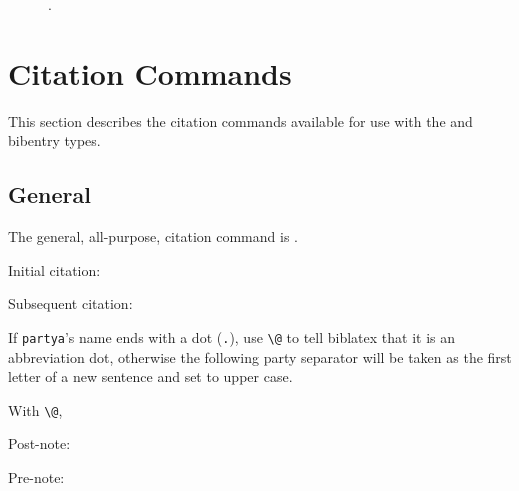 
\begin{figure}
\begin{center}
\toggletrue{lcimageshow}
\caption[The Velocity]{.}
\end{center}
\end{figure}


\renewcommand\numpardelimpre{\medskip}\renewcommand\numparindent{\hspace{0.5em}}
\section{Citation Commands}

\p This section describes the citation commands available for use with the  and  bibentry types.

\subsection{General}

\p The general, all-purpose, citation command is .

\p Initial citation: 

\p Subsequent citation: 

\p If \texttt{partya}'s name ends with a dot (\verb|.|), use \verb|\@| to tell biblatex that it is an abbreviation dot, otherwise the following party separator will be taken as the first letter of a new sentence and set to upper case.

With \verb|\@|, 


\citetrackerfalse
{}
\citetrackertrue

\p Post-note: 

\p Pre-note: 

